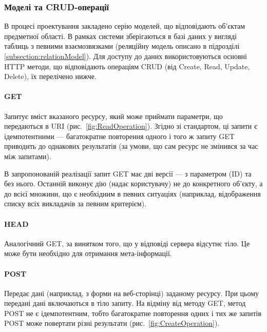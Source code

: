 \subsubsection{Моделі та CRUD-операції} \label{subs:crud}

В процесі проектування закладено серію моделей, що відповідають об’єктам предметної області. В рамках системи зберігаються в базі даних у вигляді таблиць з певними взаємозвязками (реляційну модель описано в підрозділі \ref{subsection:relationModel}). Для доступу до даних використовуються основні HTTP методи, що відповідають операціям CRUD (від Create, Read, Update, Delete), їх перелічено нижче.

\paragraph{GET}

Запитує вміст вказаного ресурсу, який може приймати параметри, що передаються в URI (рис.~\ref{fig:ReadOperation}). Згідно зі стандартом, ці запити є ідемпотентними — багатократне повторення одного і того ж запиту GET приводить до однакових результатів (за умови, що сам ресурс не змінився за час між запитами).

В запропонованій реалізації запит GET має дві версії — з параметром (ID) та без нього. Останній виконує дію (надає користувачу) не до конкретного об’єкту, а до всієї множини, що є необхідним в певних ситуаціях (наприклад, відображення списку всіх викладачів за певним критерієм).

\paragraph{HEAD}

Аналогічний GET, за винятком того, що у відповіді сервера відсутнє тіло. Це може бути необхідно для отримання мета-інформації.

\paragraph{POST}

Передає дані (наприклад, з форми на веб-сторінці) заданому ресурсу. При цьому передані дані включаються в тіло запиту. На відміну від методу GET, метод POST не є ідемпотентним, тобто багатократне повторення одних і тих же запитів POST може повертати різні результати (рис.~\ref{fig:CreateOperation}).

